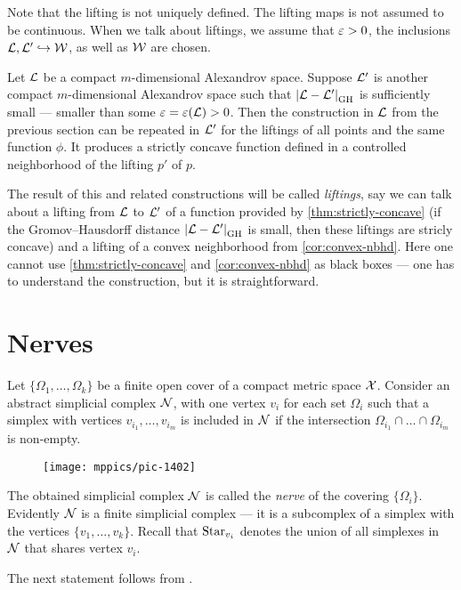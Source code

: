 Note that the lifting is not uniquely defined.
The lifting maps is not assumed to be continuous.
When we talk about liftings, we assume that $\varepsilon>0$, the inclusions $\mathcal{L},\mathcal{L}'\hookrightarrow\mathcal{W}$,
as well as $\mathcal{W}$ are chosen.

Let $\mathcal{L}$ be  a compact $m$-dimensional Alexandrov space.
Suppose $\mathcal{L}'$ is another compact $m$-dimensional Alexandrov space such that $|{\mathcal{L}}-{\mathcal{L}'}|_{\operatorname{\rm GH}\nolimits}^{{}}$ is sufficiently small --- smaller than some $\varepsilon=\varepsilon(\mathcal{L})>0$.
Then the construction in $\mathcal{L}$ from the previous section  
can be repeated in $\mathcal{L}'$ for the liftings of all points and the same function $\phi$.
It produces a strictly concave function defined in a controlled neighborhood of the lifting $p'$ of $p$.

The result of this and related constructions will be called \emph{liftings},
say we can talk about a lifting from $\mathcal{L}$ to $\mathcal{L}'$ of a function provided by \ref{thm:strictly-concave} (if the Gromov--Hausdorff distance $|{\mathcal{L}}-{\mathcal{L}'}|_{\operatorname{\rm GH}\nolimits}^{{}}$ is small, then these liftings are stricly concave)
and a lifting of a convex neighborhood from \ref{cor:convex-nbhd}.
Here one cannot use \ref{thm:strictly-concave} and \ref{cor:convex-nbhd} as black boxes --- one has to understand the construction, but it is straightforward.

\section{Nerves}

Let $\{\Omega_1,\dots,\Omega_k\}$ be a finite open cover of a compact metric space $\mathcal{X}$.
Consider an abstract simplicial complex $\mathcal{N}$, with one vertex $v_i$ for each set $\Omega_i$ such that a simplex with vertices $v_{i_1},\dots, v_{i_m}$ is included in $\mathcal{N}$ if 
the intersection $\Omega_{i_1}\cap\dots\cap \Omega_{i_m}$ is non-empty.
\begin{figure}[ht!]
\vskip-0mm
\centering
\texttt{[image: mppics/pic-1402]}
\end{figure}
The obtained simplicial complex $\mathcal{N}$ is called the \emph{nerve} of the covering $\{\Omega_i\}$.
Evidently $\mathcal{N}$ is a finite simplicial complex ---
it is a subcomplex of a simplex with the vertices $\{v_1,\dots,v_k\}$.
Recall that $\mathop{\rm Star}\nolimits_{v_i}$ denotes the union of all simplexes in $\mathcal{N}$ that shares vertex $v_i$.

The next statement follows from \cite[4G.3]{hatcher}.


